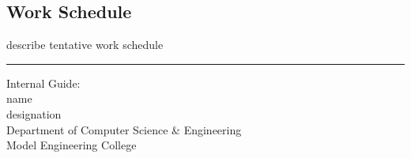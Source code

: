 \documentclass[twocolumn,10pt]{article}
\begin{document}
\subsection{Work Schedule}
describe tentative work schedule



\begin{thebibliography}{999}

\end{thebibliography}

\hrule
\vspace{.5in}
%
Internal Guide:\\
name \\
designation \\
Department of Computer Science \& Engineering \\
Model Engineering College \\
\end{document}
